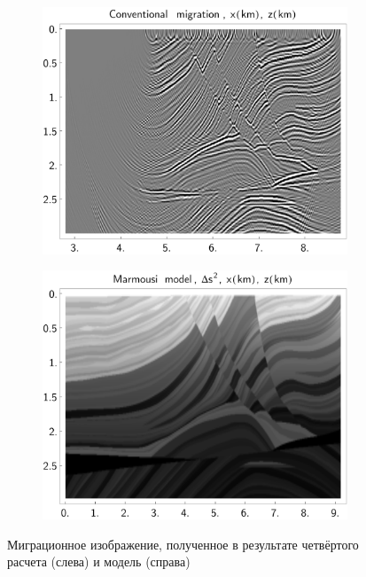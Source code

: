 \documentclass{article}
\begin{document}
\begin{figure}[tb]
\centering
\begin{subfigure}{.5\textwidth}\includegraphics[width=\textwidth,trim=0 0 0 2cm]{pic/report_april/no_migr_norm}\end{subfigure}%
\begin{subfigure}{.5\textwidth}\includegraphics[width=\textwidth,trim=0 0 0 2cm]{pic/report_april/marmousi}\end{subfigure}%
\caption{Миграционное изображение, полученное в результате четвёртого расчета (слева) и модель (справа)} \label{marmresult4b}
\end{figure}
\end{document}
